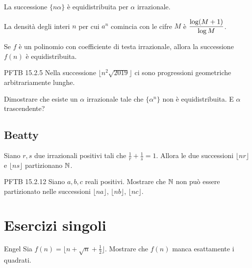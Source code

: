 \documentclass[12pt]{article}
\begin{document}
\begin{corollary}
    La successione $\{ n\alpha \}$ è equidistribuita per $\alpha$ irrazionale.
\end{corollary}

\begin{corollary}
    La densità degli interi $n$ per cui $a^n$ comincia con le cifre $M$ è $\displaystyle\frac{\log(M+1)}{\log M}$.
\end{corollary}

\begin{theorem}
    Se $f$ è un polinomio con coefficiente di testa irrazionale, allora la successione $f(n)$ è equidistribuita.
\end{theorem}

\begin{esercizio}{PFTB 15.2.5}{}
    Nella successione $\lfloor n^2\sqrt{2019} \rfloor$ ci sono progressioni geometriche arbitrariamente lunghe.
\end{esercizio}

\begin{exercise}
    Dimostrare che esiste un $\alpha$ irrazionale tale che $\{ \alpha^n \}$ non è equidistribuita. E $\alpha$ trascendente?
\end{exercise}

\subsection{Beatty}
\begin{theorem}
    Siano $r,s$ due irrazionali positivi tali che $\frac1r+\frac1s=1$. Allora le due successioni $\lfloor nr\rfloor$ e $\lfloor ns \rfloor$ partizionano $\mathbb{N}$.
\end{theorem}

\begin{esercizio}{PFTB 15.2.12}{}
    Siano $a,b,c$ reali positivi. Mostrare che $\mathbb{N}$ non può essere partizionato nelle successioni $\lfloor na\rfloor$, $\lfloor nb\rfloor$, $\lfloor nc\rfloor$.
\end{esercizio}





\newpage

\section{Esercizi singoli}

\begin{esercizio}{Engel}{}
    Sia $f(n)=\lfloor n+\sqrt n+\frac12 \rfloor$. Mostrare che $f(n)$ manca esattamente i quadrati.
\end{esercizio}
\end{document}
